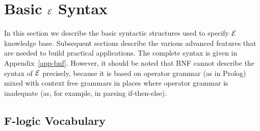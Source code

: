 \documentclass[11pt]{article}
\newcommand{\ERGO}{\mbox{\ensuremath{\cal{E}}\smaller{{\sc{RGO}}}}\xspace}
\newcommand{\FLSYSTEM}{\ERGO}
\newcommand{\fl}{\mbox{F-logic}\xspace}
\begin{document}
\section{Basic \FLSYSTEM Syntax}

In this section we describe the basic syntactic structures used to specify
\FLSYSTEM knowledge base. Subsequent sections describe the various advanced features
that are needed to build practical applications. The complete syntax is
given in Appendix~\ref{app-bnf}. However, it should be noted that BNF
cannot describe the syntax of \FLSYSTEM precisely, because it is based on
operator grammar (as in Prolog) mixed with context free grammars in
places where operator grammar is inadequate (as, for example, in parsing
if-then-else).

\subsection{\fl Vocabulary}\label{sec-basic-flogic}
\end{document}
